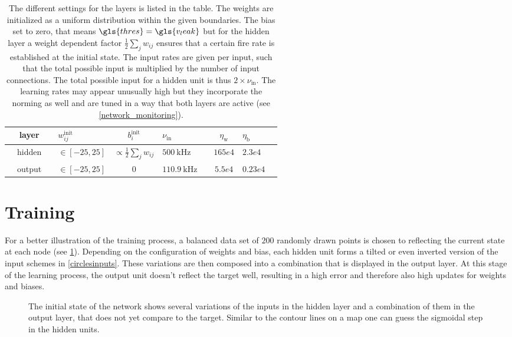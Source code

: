 \begin{table}\centering{}
	\begin{tabular}{@{}rcllcllcll@{}}\toprule
		&layer	 & & $w_{ij}^\text{init}$		& $b_i^\text{init}$ & $\nu_{\text{in}}$	& & $\eta_\text{w}$	& $\eta_\text{b}$\\ \midrule
		&hidden  & & $\in[-25, 25]$	& $\propto \frac{1}{2} \sum_j w_{ij}$ & $\SI{500}{\kilo \Hz}$	& & $165e4$			& $2.3e4$		\\
		&output  & & $\in[-25, 25]$	& $0$ & $\SI{110.9}{\kilo\Hz}$& & $5.5e4$			& $0.23e4$		\\ \bottomrule
	\end{tabular}
	\caption{The different settings for the layers is listed in the table. The weights are initialized as a uniform distribution within the given boundaries. The bias set to zero, that means $\gls{thres} = \gls{v_leak}$ but for the hidden layer a weight dependent factor $\frac{1}{2} \sum_j w_{ij}$ ensures that a certain fire rate is established at the initial state. The input rates are given per input, such that the total possible input is multiplied by the number of input connections. The total possible input for a hidden unit is thus $2 \times \nu_\text{in}$. The learning rates may appear unusually high but they incorporate the norming as well and are tuned in a way that both layers are active (see \cref{network_monitoring}).}
\end{table}


\section{Training}
For a better illustration of the training process, a balanced data set of $200$ randomly drawn points is chosen to reflecting the current state at each node (see \cref{learning_process_s5}). Depending on the configuration of weights and bias, each hidden unit forms a tilted or even inverted version of the input schemes in \cref{circlesinputs}. These variations are then composed into a combination that is displayed in the output layer. At this stage of the learning process, the output unit doesn't reflect the target well, resulting in a high error and therefore also high updates for weights and biases.
\begin{figure}
	\label{learning_process_s5}
	
	\caption{The initial state of the network shows several variations of the inputs in the hidden layer and a combination of them in the output layer, that does not yet compare to the target. Similar to the contour lines on a map one can guess the sigmoidal step in the hidden units. }
\end{figure}

